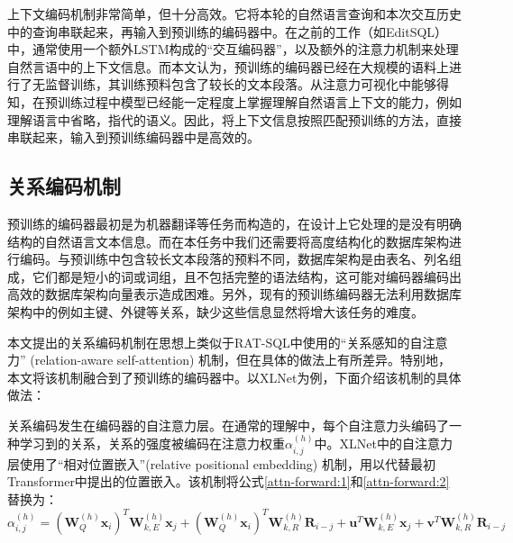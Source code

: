 上下文编码机制非常简单，但十分高效。它将本轮的自然语言查询和本次交互历史中的查询串联起来，再输入到预训练的编码器中。在之前的工作（如EditSQL\cite{edit19}）中，通常使用一个额外LSTM构成的“交互编码器”，以及额外的注意力机制来处理自然言语中的上下文信息。而本文认为，预训练的编码器已经在大规模的语料上进行了无监督训练，其训练预料包含了较长的文本段落。从注意力可视化\cite{attn17}中能够得知，在预训练过程中模型已经能一定程度上掌握理解自然语言上下文的能力，例如理解语言中省略，指代的语义。因此，将上下文信息按照匹配预训练的方法，直接串联起来，输入到预训练编码器中是高效的。

\subsection{关系编码机制}

预训练的编码器最初是为机器翻译等任务而构造的，在设计上它处理的是没有明确结构的自然语言文本信息。而在本任务中我们还需要将高度结构化的数据库架构进行编码。与预训练中包含较长文本段落的预料不同，数据库架构是由表名、列名组成，它们都是短小的词或词组，且不包括完整的语法结构，这可能对编码器编码出高效的数据库架构向量表示造成困难。另外，现有的预训练编码器无法利用数据库架构中的例如主键、外键等关系，缺少这些信息显然将增大该任务的难度。

本文提出的关系编码机制在思想上类似于RAT-SQL\cite{ratsql19}中使用的“关系感知的自注意力” (relation-aware self-attention) 机制，但在具体的做法上有所差异。特别地，本文将该机制融合到了预训练的编码器中。以XLNet为例，下面介绍该机制的具体做法：

关系编码发生在编码器的自注意力层。在通常的理解中，每个自注意力头编码了一种学习到的关系，关系的强度被编码在注意力权重$\alpha_{i,j}^{\left(h\right)}$中。XLNet中的自注意力层使用了“相对位置嵌入”(relative positional embedding) 机制，用以代替最初Transformer中提出的位置嵌入。该机制将公式\ref{attn-forward:1}和\ref{attn-forward:2}替换为：
\begin{equation}
    \alpha_{i,j}^{(h)}=
        \left(\bm{W}_Q^{(h)}\bm{x}_i\right)^T\bm{W}_{k,E}^{(h)}\bm{x}_j+
        \left(\bm{W}_Q^{(h)}\bm{x}_i\right)^T\bm{W}_{k,R}^{(h)}\bm{R}_{i-j}+
        \bm{u}^T\bm{W}_{k,E}^{(h)}\bm{x}_j+
        \bm{v}^T\bm{W}_{k,R}^{(h)}\bm{R}_{i-j}
\end{equation}

